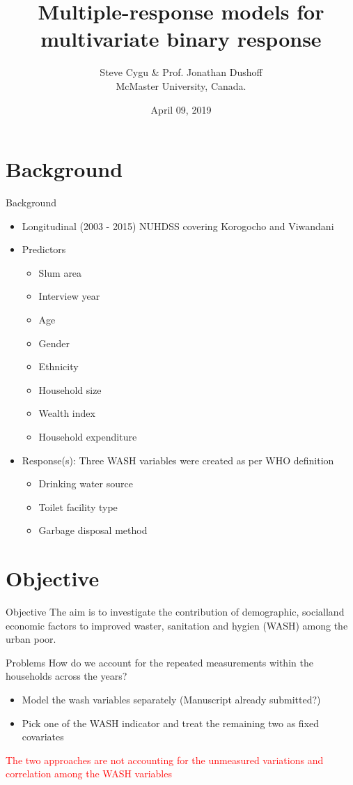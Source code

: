 \documentclass{beamer}
\title{Multiple-response models for multivariate binary response}
\author{Steve Cygu \& Prof. Jonathan Dushoff\\ \vspace{1cm} McMaster University, Canada.}
\date{April 09, 2019}
\begin{document}
\frame{\titlepage}



\section{Background}

\begin{frame}{Background}
\begin{itemize}[<+->]
\item Longitudinal (2003 - 2015) NUHDSS covering Korogocho and Viwandani
\item Predictors
\begin{itemize}[<+->]
\item Slum area
\item Interview year
\item Age
\item Gender
\item Ethnicity
\item Household size
\item Wealth index
\item Household expenditure
\end{itemize}
\item Response(s): Three WASH variables were created as per WHO definition

\begin{itemize}[<+->]
\item Drinking water source
\item Toilet facility type
\item Garbage disposal method
\end{itemize}
\end{itemize}

\end{frame}


\section{Objective}

\begin{frame}{Objective}
The aim is to investigate the contribution of demographic, socialland economic factors to improved waster, sanitation and hygien (WASH) among the urban poor.
\end{frame}

\begin{frame}{Problems}
How do we account for the repeated measurements within the households across the years?
\begin{itemize}[<+->]
\item Model the wash variables separately (Manuscript already submitted?)
\item Pick one of the WASH indicator and treat the remaining two as fixed covariates
\end{itemize}
\pause
\textcolor{red}{The two approaches are not accounting for the unmeasured variations and correlation among the WASH variables} 
\end{frame}
\end{document}
